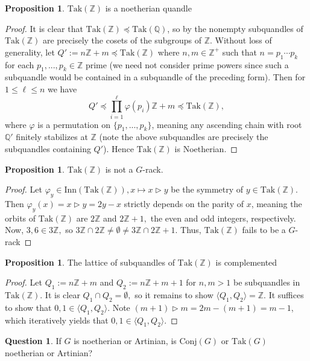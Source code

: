 \documentclass[reqno,dvipsnames]{amsart}
\newcommand{\la}{\langle}
\newcommand{\ra}{\rangle}
\newcommand{\Z}{\mathbb{Z}}
\newcommand{\Q}{\mathbb{Q}}
\newcommand{\Conj}{\text{Conj}}
\newcommand{\Inn}{\text{Inn}}
\newcommand{\Tak}{\text{Tak}}
\theoremstyle{definition}
\newtheorem{proposition}[theorem]{Proposition}
\newtheorem{question}[theorem]{Question}
\begin{document}
\begin{proposition}
$\Tak(\Z)$ is a noetherian quandle
\end{proposition}

\begin{proof}
It is clear that $\Tak(\Z) \preceq \Tak(\Q)$, so by \cite[Lemma 5.1]{saki2018complemented} the nonempty subquandles of $\Tak(\Z)$ are precisely the cosets of the subgroups of $\Z$. Without loss of generality, let $Q' := n\Z + m \preceq \Tak(\Z)$ where $n,m \in \Z^+$ such that $n = p_1\cdots p_k$ for each $p_1,...,p_k \in \Z$ prime (we need not consider prime powers since such a subquandle would be contained in a subquandle of the preceding form). Then for $1\leq\ell\leq n$ we have
\[Q' \preceq \prod_{i=1}^\ell\varphi(p_i)\Z+m\preceq \Tak(\Z),\]
where $\varphi$ is a permutation on $\{p_1,...,p_k\}$, meaning any ascending chain with root $\Q'$ finitely stabilizes at $\Z$ (note the above subquandles are precisely the subquandles containing $Q'$). Hence $\Tak(\Z)$ is Noetherian.
\end{proof}

\begin{proposition}
$\Tak(\Z)$ is not a $G$-rack.
\end{proposition}

\begin{proof}
Let $\varphi_y \in \Inn(\Tak(\Z)), x \mapsto x \triangleright y$ be the symmetry of $y \in \Tak(\Z).$ Then $\varphi_y(x) = x \triangleright y = 2y - x$ strictly depends on the parity of $x$, meaning the orbits of $\Tak(\Z)$ are $2\Z$ and $2\Z + 1,$ the even and odd integers, respectively. Now, $3,6 \in 3\Z,$ so $3\Z \cap 2\Z \neq \emptyset \neq 3\Z \cap 2\Z + 1.$ Thus, $\Tak(\Z)$ fails to be a $G$-rack
\end{proof}

\begin{proposition}
The lattice of subquandles of $\Tak (\Z)$ is complemented
\end{proposition}

\begin{proof}
Let $Q_1 := n\Z + m$ and $Q_2 := n\Z + m + 1$ for $n,m > 1$ be subquandles in $\Tak(\Z)$. It is clear $Q_1 \cap Q_2 = \emptyset,$ so it remains to show $\la Q_1, Q_2\ra = \mathbb{Z}$. It suffices to show that $0,1 \in \la Q_1, Q_2\ra$. Note $(m+1)\triangleright m=2m-(m+1)=m-1$, which iteratively yields that $0,1\in\la Q_1, Q_2\ra.$ 
\end{proof}

\begin{question}
If $G$ is noetherian or Artinian, is $\Conj(G)$ or $\Tak(G)$ noetherian or Artinian?
\end{question}
\end{document}
